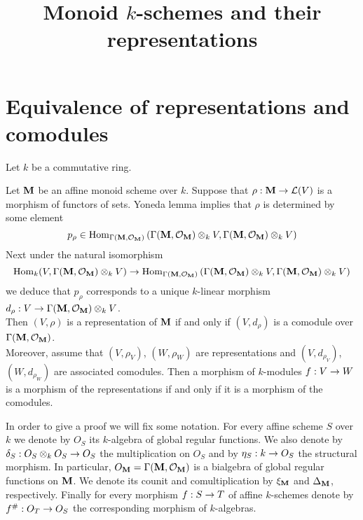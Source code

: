 



\title{Monoid $k$-schemes and their representations}
\date{}
\maketitle

\section{Equivalence of representations and comodules}
\noindent 
Let $k$ be a commutative ring.

\begin{theorem}\label{comodulesandrepresentationsthm}
Let $\mathbf{M}$ be an affine monoid scheme over $k$. Suppose that $\rho:\mathbf{M}\rightarrow {\mathcal L}(V)$ is a morphism of functors of sets. Yoneda lemma implies that $\rho$ is determined by some element 
$$p_{\rho}\in \mathrm{Hom}_{\Gamma(\mathbf{M},{\mathcal O}_{\mathbf{M}})}\left(\Gamma(\mathbf{M},{\mathcal O}_{\mathbf{M}})\otimes_{k}V,\Gamma(\mathbf{M},{\mathcal O}_{\mathbf{M}})\otimes_{k}V\right)$$
Next under the natural isomorphism
$$\mathrm{Hom}_{k}(V,\Gamma(\mathbf{M},{\mathcal O}_{\mathbf{M}})\otimes_{k}V)\rightarrow \mathrm{Hom}_{\Gamma(\mathbf{M},{\mathcal O}_{\mathbf{M}})}\left(\Gamma(\mathbf{M},{\mathcal O}_{\mathbf{M}})\otimes_{k}V,\Gamma(\mathbf{M},{\mathcal O}_{\mathbf{M}})\otimes_{k}V\right)$$
we deduce that $p_{\rho}$ corresponds to a unique $k$-linear morphism $d_{\rho}:V\rightarrow \Gamma(\mathbf{M},{\mathcal O}_{\mathbf{M}})\otimes_{k}V$.\\
Then $(V,\rho)$ is a representation of $\mathbf{M}$ if and only if $(V,d_{\rho})$ is a comodule over $\Gamma(\mathbf{M},{\mathcal O}_{\mathbf{M}})$.\\
Moreover, assume that $(V,\rho_V)$, $(W,\rho_W)$ are representations and $(V,d_{\rho_V})$, $(W,d_{\rho_W})$ are associated comodules. Then a morphism of $k$-modules $f:V\rightarrow W$ is a morphism of the representations if and only if it is a morphism of the comodules.
\end{theorem}
\noindent
In order to give a proof we will fix some notation. For every affine scheme $S$ over $k$ we denote by $O_S$ its $k$-algebra of global regular functions. We also denote by $\delta_S:O_S\otimes_{k}O_S\rightarrow O_S$ the multiplication on $O_S$ and by $\eta_S:k\rightarrow O_S$ the structural morphism. In particular, $O_{\mathbf{M}}=\Gamma(\mathbf{M},{\mathcal O}_{\mathbf{M}})$ is a bialgebra of global regular functions on $\mathbf{M}$. We denote its counit and comultiplication by $\xi_{\mathbf{M}}$ and $\Delta_{\mathbf{M}}$, respectively. Finally for every morphism $f:S\rightarrow T$ of affine $k$-schemes denote by $f^{\#}:O_T\rightarrow O_S$ the corresponding morphism of $k$-algebras.\\
